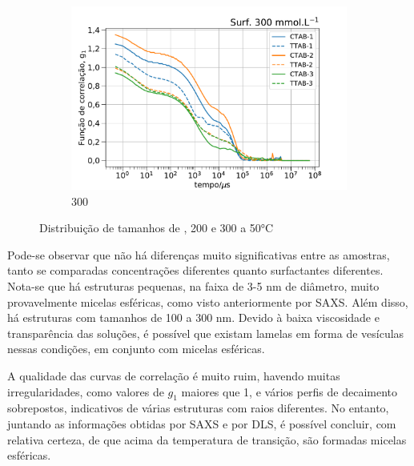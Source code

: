 \begin{figure}[h]
\begin{subfigure}{0.3\textwidth}
		\centering
		\includegraphics[width=\textwidth]{imagens/dls/300_CC}
		\caption{300 \mM}
		\label{fig:DLS_300_CC}
	\end{subfigure}
	\caption{Distribuição de tamanhos de , 200 e 300 \mM{} a 50°C}
	\label{fig:DLS_CC_conc}
\end{figure}

	Pode-se observar que não há diferenças muito significativas entre as amostras, tanto se comparadas concentrações diferentes quanto surfactantes diferentes. Nota-se que há estruturas pequenas, na faixa de 3-5 nm de diâmetro, muito provavelmente micelas esféricas, como visto anteriormente por SAXS. Além disso, há estruturas com tamanhos de 100 a 300 nm. Devido à baixa viscosidade e transparência das soluções, é possível que existam lamelas em forma de vesículas nessas condições, em conjunto com micelas esféricas.
	
	A qualidade das curvas de correlação é muito ruim, havendo muitas irregularidades, como valores de \(g_1\) maiores que 1, e vários perfis de decaimento sobrepostos, indicativos de várias estruturas com raios diferentes. No entanto, juntando as informações obtidas por SAXS e por DLS, é possível concluir, com relativa certeza, de que acima da temperatura de transição, são formadas micelas esféricas. 
	

